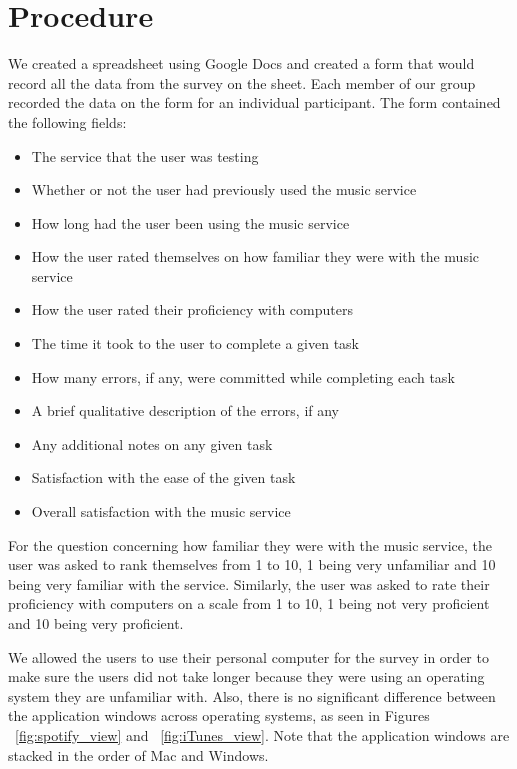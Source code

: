\documentclass[11pt]{article}
\begin{document}
\section{Procedure}
We created a spreadsheet using Google Docs and created a form that would record all the data from the survey on the sheet. Each member of our group recorded the data on the form for an individual participant. The form contained the following fields:
\begin{itemize}
    \item The service that the user was testing 
    \item Whether or not the user had previously used the music service 
    \item How long had the user been using the music service 
    \item How the user rated themselves on how familiar they were with the music service
    \item How the user rated their proficiency with computers
    \item The time it took to the user to complete a given task
    \item How many errors, if any, were committed while completing each task
    \item A brief qualitative description of the errors, if any
    \item Any additional notes on any given task
    \item Satisfaction with the ease of the given task
    \item Overall satisfaction with the music service
\end{itemize}  
For the question concerning how familiar they were with the music service, the user was asked to rank themselves from 1 to 10, 1 being very unfamiliar and 10 being very familiar with the service. Similarly, the user was asked to rate their proficiency with computers on a scale from 1 to 10, 1 being not very proficient and 10 being very proficient.

We allowed the users to use their personal computer for the survey in order to make sure the users did not take longer because they were using an operating system they are unfamiliar with. %
Also, there is no significant difference between the application windows across operating systems, as seen in Figures ~\ref{fig:spotify_view} and ~\ref{fig:iTunes_view}. Note that the application windows are stacked in the order of Mac and Windows.
\end{document}
